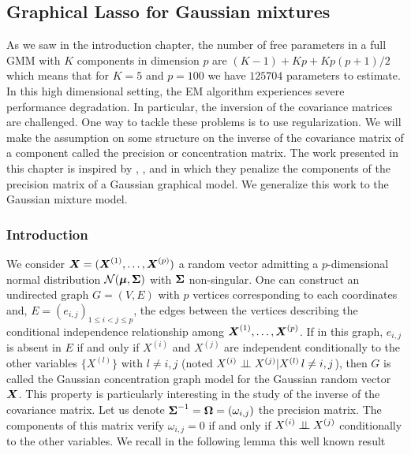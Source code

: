 \subsection{Graphical Lasso for Gaussian mixtures}\label{chapgraphlasso}
As we saw in the introduction chapter, the number of free parameters in a full GMM with $K$ components in dimension $p$ are $(K-1)+Kp+Kp(p+1)/2$ which means that for $K=5$ and $p=100$ we have $125704$ parameters to estimate. In this high dimensional setting, the EM algorithm experiences severe performance degradation. In particular, the inversion of the covariance matrices are challenged. One way to tackle these problems is to use regularization. We will make the assumption on some structure on the inverse of the covariance matrix of a component called the precision or concentration matrix. The work presented in this chapter is inspired by \citep{glasso07}, \citep{banerjee}, \citep{yuanLin_graph} and \citep{meinshausen2006} in which they penalize the components of the precision matrix of a Gaussian graphical model. We generalize this work to the Gaussian mixture model.

\subsubsection{Introduction}
We consider $\boldsymbol X=(\boldsymbol X^{(1)},\dots,\boldsymbol X^{(p)})$ a random vector admitting a $p$-dimensional normal distribution $\mathcal N(\boldsymbol\mu, \boldsymbol\Sigma)$ with $\boldsymbol\Sigma$ non-singular. One can construct an undirected graph $G=(V,E)$ with $p$ vertices corresponding to each coordinates and, $E=(e_{i,j})_{1\leq i < j \leq p}$, the edges between the vertices describing the conditional independence relationship among $\boldsymbol X^{(1)},\dots,\boldsymbol X^{(p)}$. 
If in this graph, $e_{i,j}$ is absent in $E$ if and only if $X^{(i)}$ and $X^{(j)}$ 
are independent conditionally to the other variables $\{X^{(l)}\}$ with $l\neq i,j$ (noted $X^{(i)} \perp\!\!\!\perp X^{(j)}|X^{(l)}\, l\neq i,j$), then $G$ is called the Gaussian concentration graph model for the Gaussian random vector $\boldsymbol X$. 
This property is particularly interesting in the study of the inverse of the covariance matrix. Let us denote $\boldsymbol\Sigma^{-1}=\boldsymbol\Omega=(\omega_{i,j})$ the precision matrix. The components of this matrix verify $\omega_{i,j}=0$ if and only if $X^{(i)} \perp\!\!\!\perp X^{(j)}$ conditionally to the other variables. We recall in the following lemma this well known result

